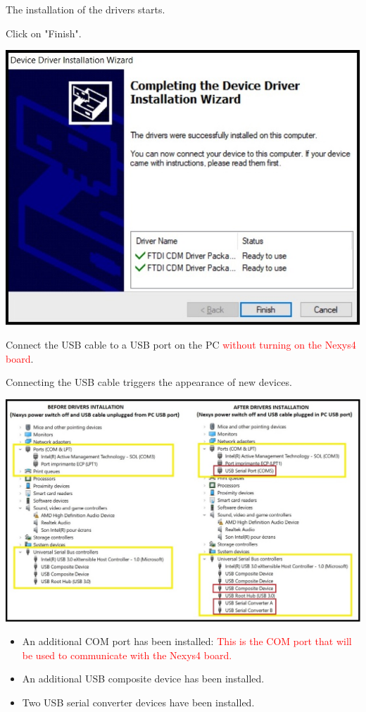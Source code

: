 The installation of the drivers starts.

\begin{minipage}{\linewidth}
  Click on "Finish".
  \\
  \begin{center}
    \includegraphics[width=0.6\linewidth]{images/img001_install_drivers_05.jpg}
  \end{center}
\end{minipage}

Connect the USB cable to a USB port on the PC \textcolor{red}{without turning on the Nexys4 board}.

Connecting the USB cable triggers the appearance of new devices.

\includegraphics[width=\linewidth]{images/img001_install_drivers_07.jpg}

\begin{itemize}
  \item An additional COM port has been installed: \textcolor{red}{This is the COM port that will be used to communicate with the Nexys4 board.}
  \item An additional USB composite device has been installed.
  \item Two USB serial converter devices have been installed.
\end{itemize}

